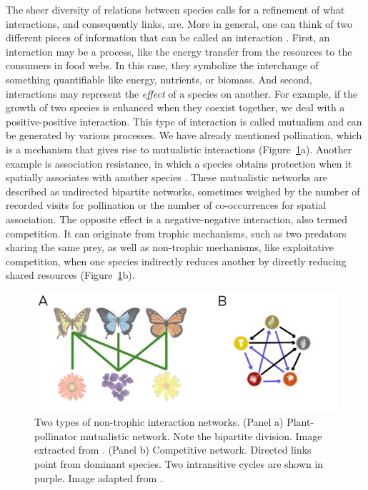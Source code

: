 The sheer diversity of relations between species calls for a refinement of what interactions, and consequently links, are. More in general, one can think of two different pieces of information that can be called an interaction \cite{verhoef2010community}. First, an interaction may be a process, like the energy transfer from the resources to the consumers in food webs. In this case, they symbolize the interchange of something quantifiable like energy, nutrients, or biomass. And second, interactions may represent the \textit{effect} of a species on another. For example, if the growth of two species is enhanced when they coexist together, we deal with a positive-positive interaction. This type of interaction is called mutualism and can be generated by various processes. We have already mentioned pollination, which is a mechanism that gives rise to mutualistic interactions (Figure~\ref{chp:methods:fig:mut-comp}a). Another example is association resistance, in which a species obtains protection when it spatially associates with another species \cite{Dieckmann2000}. These mutualistic networks are described as undirected bipartite networks, sometimes weighed by the number of recorded visits for pollination or the number of co-occurrences for spatial association. The opposite effect is a negative-negative interaction, also termed competition. It can originate from trophic mechanisms, such as two predators sharing the same prey, as well as non-trophic mechanisms, like exploitative competition, when one species indirectly reduces another by  directly reducing shared resources \cite{wootton1994nature} (Figure~\ref{chp:methods:fig:mut-comp}b). \\
\begin{figure}[t]
     \centering
\includegraphics[width=\columnwidth]{figures/methods/fig_mut-comp.pdf}
 \caption[Mutualistic and competitive networks]{Two types of non-trophic interaction networks. (Panel a) Plant-pollinator mutualistic network. Note the bipartite division. Image extracted from \cite{rohr2014structural}. (Panel b) Competitive network. Directed links point from dominant species. Two intransitive cycles are shown in purple. Image adapted from \cite{soliveres2015intransitive}.}
\label{chp:methods:fig:mut-comp}
\end{figure}

